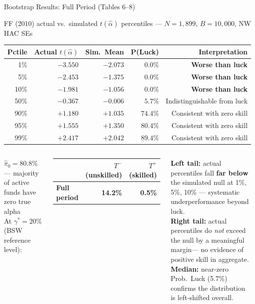 \documentclass[aspectratio=169,10pt]{beamer}
\newcommand{\red}[1]{\textcolor{AlertRed}{\textbf{#1}}}
\newcommand{\green}[1]{\textcolor{SkillGreen}{\textbf{#1}}}
\begin{document}
\begin{frame}{Bootstrap Results: Full Period (Tables 6--8)}
\begin{center}
{\footnotesize FF (2010) actual vs.\ simulated $t(\hat{\alpha})$ percentiles — $N=1{,}899$, $B=10{,}000$, NW HAC SEs}
\vspace{3pt}

\setlength{\tabcolsep}{5pt}
\begin{tabular}{rrrrr}
\toprule
\textbf{Pctile} & \textbf{Actual $t(\hat{\alpha})$} & \textbf{Sim.\ Mean} & \textbf{P(Luck)} & \textbf{Interpretation}\\
\midrule
1\%  & $-3.550$ & $-2.073$ & $0.0\%$ & \red{Worse than luck} \\
5\%  & $-2.453$ & $-1.375$ & $0.0\%$ & \red{Worse than luck} \\
10\% & $-1.981$ & $-1.056$ & $0.0\%$ & \red{Worse than luck} \\
50\% & $-0.367$ & $-0.006$ & $5.7\%$ & Indistinguishable from luck \\
90\% & $+1.180$ & $+1.035$ & $74.4\%$ & Consistent with zero skill \\
95\% & $+1.555$ & $+1.350$ & $80.4\%$ & Consistent with zero skill \\
99\% & $+2.417$ & $+2.042$ & $89.4\%$ & Consistent with zero skill \\
\bottomrule
\end{tabular}
\end{center}
\vspace{3pt}
\begin{columns}[T]
{\footnotesize
$\hat{\pi}_0 = \mathbf{80.8\%}$ — majority of active funds have zero true alpha\\[5pt]
At $\gamma^* = 20\%$ (BSW reference level):
\vspace{3pt}
\begin{center}
\setlength{\tabcolsep}{4pt}
\begin{tabular}{lrr}
\toprule
 & $T^-$ (unskilled) & $T^+$ (skilled)\\
\midrule
\textbf{Full period} & \red{14.2\%} & \green{0.5\%} \\
\bottomrule
\end{tabular}
\end{center}}

{\footnotesize
\textbf{Left tail:} actual percentiles fall \red{far below} the simulated null at 1\%, 5\%, 10\% — systematic underperformance beyond luck.\\[5pt]
\textbf{Right tail:} actual percentiles do \emph{not} exceed the null by a meaningful margin— no evidence of positive skill in aggregate.\\[5pt]
\textbf{Median:} near-zero Prob.\ Luck (5.7\%) confirms the distribution is left-shifted overall.}
\end{columns}
\end{frame}
\end{document}
